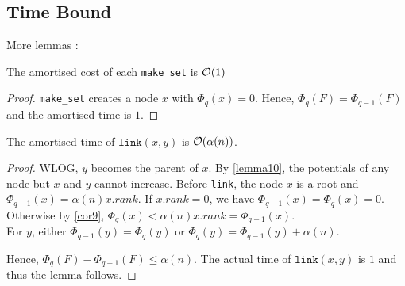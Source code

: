 \documentclass[12pt]{cours}
\begin{document}
\subsection{Time Bound}
More lemmas :
\begin{lemma}
    The amortised cost of each \texttt{make\_set} is $\mathcal{O}(1)$
\end{lemma}
\begin{proof}
    \texttt{make\_set} creates a node $x$ with $\Phi_{q}(x) = 0$. Hence, $\Phi_{q}(F) = \Phi_{q - 1}(F)$ and the amortised time is $1$.
\end{proof}

\begin{lemma}
    The amortised time of $\texttt{link}(x, y)$ is $\mathcal{O}(\alpha(n))$.
\end{lemma}
\begin{proof}
    WLOG, $y$ becomes the parent of $x$. By \ref{lemma10}, the potentials of any node but $x$ and $y$ cannot increase. Before \texttt{link}, the node $x$ is a root and $\Phi_{q - 1}(x) = \alpha(n)x.rank$. If $x.rank = 0$, we have $\Phi_{q - 1}(x) = \Phi_{q}(x) = 0$. Otherwise by \ref{cor9}, $\Phi_{q}(x) < \alpha(n)x.rank = \Phi_{q - 1}(x)$.\\
    For $y$, either $\Phi_{q - 1}(y) = \Phi_{q}(y)$ or $\Phi_{q}(y) = \Phi_{q - 1}(y) + \alpha(n)$.

    Hence, $\Phi_{q}(F) - \Phi_{q - 1}(F) \leq \alpha(n)$. The actual time of $\texttt{link}(x, y)$ is $1$ and thus the lemma follows.
\end{proof}
\end{document}
